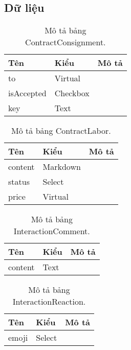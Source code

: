 \subsection{Dữ liệu}
\begin{table}[h!]
\begin{center}
\begin{tabular}{ |l|l|l| } 
	\hline
	Tên & Kiểu & Mô tả \\
	\hline
	to & Virtual & \dotfill \\
isAccepted & Checkbox & \dotfill \\
key & Text & \dotfill \\ 
	\hline
\end{tabular}
	\caption{Mô tả bảng ContractConsignment.}
	\label{table:ContractConsignment}
\end{center}
\end{table}


\begin{table}[h!]
\begin{center}
\begin{tabular}{ |l|l|l| } 
	\hline
	Tên & Kiểu & Mô tả \\
	\hline
	content & Markdown & \dotfill \\
status & Select & \dotfill \\
price & Virtual & \dotfill \\ 
	\hline
\end{tabular}
	\caption{Mô tả bảng ContractLabor.}
	\label{table:ContractLabor}
\end{center}
\end{table}


\begin{table}[h!]
\begin{center}
\begin{tabular}{ |l|l|l| } 
	\hline
	Tên & Kiểu & Mô tả \\
	\hline
	content & Text & \dotfill \\ 
	\hline
\end{tabular}
	\caption{Mô tả bảng InteractionComment.}
	\label{table:InteractionComment}
\end{center}
\end{table}


\begin{table}[h!]
\begin{center}
\begin{tabular}{ |l|l|l| } 
	\hline
	Tên & Kiểu & Mô tả \\
	\hline
	emoji & Select & \dotfill \\ 
	\hline
\end{tabular}
	\caption{Mô tả bảng InteractionReaction.}
	\label{table:InteractionReaction}
\end{center}
\end{table}


